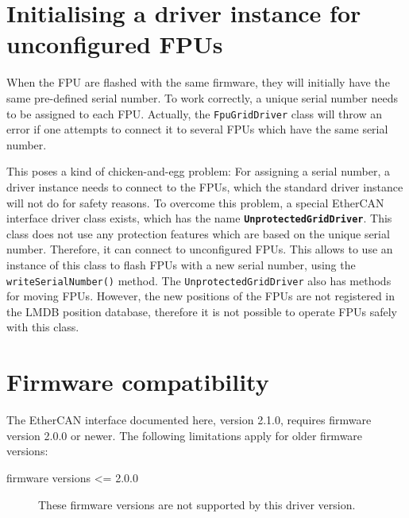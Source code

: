 \documentclass[fontsize=12,a4paper]{scrreprt}
\begin{document}
\chapter{Initialising a driver instance for unconfigured FPUs}

%
%
%
%
%
%


When the FPU are flashed with the same firmware, they will initially
have the same pre-defined serial number. To work correctly, a unique
serial number needs to be assigned to each FPU.  Actually, the
\texttt{FpuGridDriver} class will throw an error if one attempts to
connect it to several FPUs which have the same serial number.

This poses a kind of chicken-and-egg problem: For assigning a serial
number, a driver instance needs to connect to the FPUs, which the
standard driver instance will not do for safety reasons. To overcome
this problem, a special EtherCAN interface driver class exists, which
has the name \textbf{\texttt{UnprotectedGridDriver}}. This class does
not use any protection features which are based on the unique serial
number. Therefore, it can connect to unconfigured FPUs. This allows to
use an instance of this class to flash FPUs with a new serial number,
using the \texttt{writeSerialNumber()} method. The
\texttt{UnprotectedGridDriver} also has methods for moving
FPUs. However, the new positions of the FPUs are not registered in the
LMDB position database, therefore it is not possible to operate FPUs
safely with this class.


\chapter{Firmware compatibility}
\label{sec:firmware_compatibility}

The EtherCAN interface documented here, version 2.1.0, requires
firmware version 2.0.0 or newer. The following limitations apply for
older firmware versions:

\begin{description}

\item[firmware versions <= 2.0.0] These firmware versions are not
  supported by this driver version.


\end{description}
\end{document}

